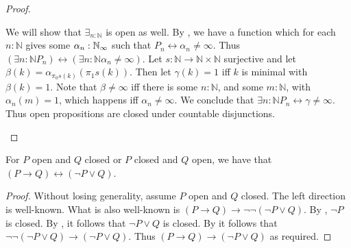 \documentclass{../util/zariski-small}
\begin{document}
\begin{proof}
\begin{itemize}
      We will show that $\exists_{n:\mathbb N}$ is open as well. 
      By , we have a function which for each $n:\mathbb N$ gives some $\alpha_n:\mathbb{N}_{\infty}$ 
      such that $P_n \leftrightarrow \alpha_n \neq \infty$. 
      Thus $(\exists{n:\mathbb N} P_n) \leftrightarrow (\exists{n:\mathbb N}\alpha_n \neq \infty)$. 
      Let $s:\mathbb N \to \mathbb N \times \mathbb N$ surjective and let 
      $\beta(k) = \alpha_{\pi_0s(k)}(\pi_1 s(k))$. 
      Then let $\gamma(k) = 1$ iff $k$ is minimal with $\beta(k) = 1$. 
      Note that $\beta \neq \infty$ iff there is some $n:\mathbb N$, and some $m:\mathbb N$, with $\alpha_n(m) = 1$, 
      which happens iff $\alpha_n \neq \infty$. 
      We conclude that $\exists{n:\mathbb N} P_n \leftrightarrow \gamma \neq \infty$.
      Thus open propositions are closed under countable disjunctions. 
  \end{itemize}   
\end{proof}


\begin{lemma}
  For $P$ open and $Q$ closed or $P$ closed and $Q$ open, we have that $(P\to Q) \leftrightarrow (\neg P \vee Q)$. 
\end{lemma}
\begin{proof}
  Without losing generality, assume $P$ open and $Q$ closed. 
  The left direction is well-known. 
  What is also well-known is 
  $(P \to Q) \to \neg \neg (\neg P \vee Q)$.
  By , $\neg P$ is closed. 
  By , it follows that $\neg P \vee Q$ is closed. 
  By  it follows that $\neg \neg (\neg P \vee Q) \to (\neg P \vee Q)$. 
  Thus $(P \to Q) \to (\neg P \vee Q)$ as required. 
\end{proof}
 
\end{document}
